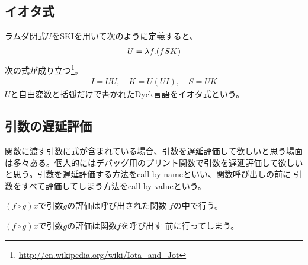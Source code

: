 {\subsection{イオタ式}\label{s2:イオタ式} %
	ラムダ閉式$U$をSKIを用いて次のように定義すると、
	\begin{equation*}\begin{split}
		U = \lambda{f}.(fSK)
	\end{split}\end{equation*}
	次の式が成り立つ\footnote{
		\url{http://en.wikipedia.org/wiki/Iota_and_Jot}
	}。
	\begin{equation*}\begin{split}
		I = UU,\quad K = U(UI),\quad S = UK
	\end{split}\end{equation*}
	$U$と自由変数と括弧だけで書かれたDyck言語をイオタ式という。
\subsection{引数の遅延評価}\label{s2:引数の遅延評価} %
	関数に渡す引数に式が含まれている場合、引数を遅延評価して欲しいと思う場面
	は多々ある。個人的にはデバッグ用のプリント関数で引数を遅延評価して欲しい
	と思う。引数を遅延評価する方法をcall-by-nameといい、関数呼び出しの前に
	引数をすべて評価してしまう方法をcall-by-valueという。
	\begin{description}\setlength{\itemsep}{-1mm} %
		\item[call-by-name] $(f\circ g)x$で引数$g$の評価は呼び出された関数
		$f$の中で行う。
		\item[call-by-value] $(f\circ g)x$で引数$g$の評価は関数$f$を呼び出す
		前に行ってしまう。
	\end{description} %
}
